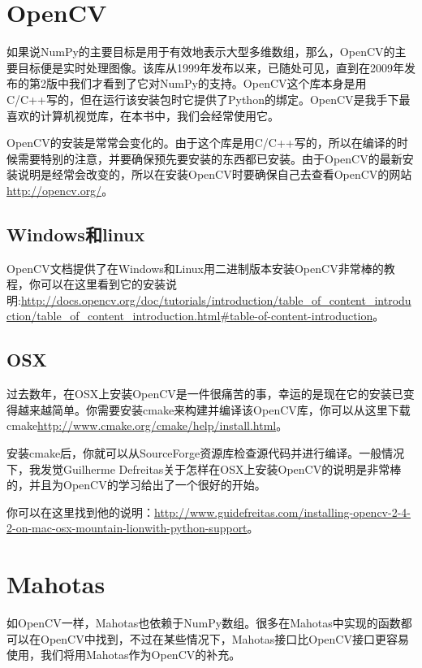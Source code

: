 \documentclass[color=green,mathpazo,titlestyle=hang]{elegantbook}
\begin{document}
\section{OpenCV}

如果说NumPy的主要目标是用于有效地表示大型多维数组，那么，OpenCV的主要目标便是实时处理图像。该库从1999年发布以来，已随处可见，直到在2009年发布的第2版中我们才看到了它对NumPy的支持。OpenCV这个库本身是用C/C++写的，但在运行该安装包时它提供了Python的绑定。OpenCV是我手下最喜欢的计算机视觉库，在本书中，我们会经常使用它。

OpenCV的安装是常常会变化的。由于这个库是用C/C++写的，所以在编译的时候需要特别的注意，并要确保预先要安装的东西都已安装。由于OpenCV的最新安装说明是经常会改变的，所以在安装OpenCV时要确保自己去查看OpenCV的网站\url{http://opencv.org/}。

\subsection{Windows和linux}

OpenCV文档提供了在Windows和Linux用二进制版本安装OpenCV非常棒的教程，你可以在这里看到它的安装说明:\url{http://docs.opencv.org/doc/tutorials/introduction/table_of_content_introduction/table_of_content_introduction.html#table-of-content-introduction}。

\subsection{OSX}

过去数年，在OSX上安装OpenCV是一件很痛苦的事，幸运的是现在它的安装已变得越来越简单。你需要安装cmake来构建并编译该OpenCV库，你可以从这里下载cmake\href{http://www.cmake.org/cmake/help/install.html}{http://www.cmake.org/cmake/help/install.html}。

安装cmake后，你就可以从SourceForge资源库检查源代码并进行编译。一般情况下，我发觉Guilherme Defreitas关于怎样在OSX上安装OpenCV的说明是非常棒的，并且为OpenCV的学习给出了一个很好的开始。

你可以在这里找到他的说明：\href{http://www.guidefreitas.com/installing-opencv-2-4-2-on-mac-osx-mountain-lionwith-python-support}{http://www.guidefreitas.com/installing-opencv-2-4-2-on-mac-osx-mountain-lionwith-python-support}。

\section{Mahotas}

如OpenCV一样，Mahotas也依赖于NumPy数组。很多在Mahotas中实现的函数都可以在OpenCV中找到，不过在某些情况下，Mahotas接口比OpenCV接口更容易使用，我们将用Mahotas作为OpenCV的补充。
\end{document}
